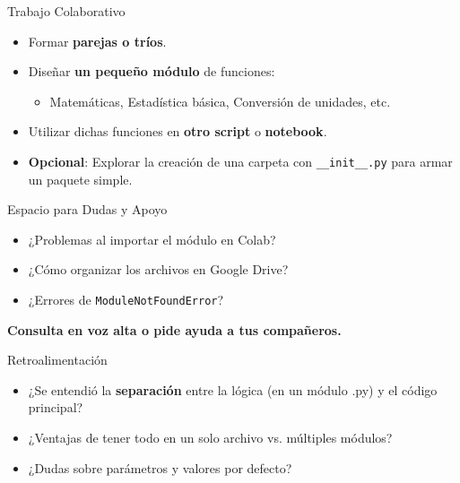 \documentclass[10pt]{beamer}
\begin{document}
\begin{frame}{Trabajo Colaborativo}
  \begin{itemize}
    \item Formar \textbf{parejas o tríos}.
    \item Diseñar \textbf{un pequeño módulo} de funciones:
      \begin{itemize}
        \item Matemáticas, Estadística básica, Conversión de unidades, etc.
      \end{itemize}
    \item Utilizar dichas funciones en \textbf{otro script} o \textbf{notebook}.
    \item \textbf{Opcional}: Explorar la creación de una carpeta con \texttt{\_\_init\_\_.py} para armar un paquete simple.
  \end{itemize}
\end{frame}

\begin{frame}{Espacio para Dudas y Apoyo}
  \begin{itemize}
    \item ¿Problemas al importar el módulo en Colab?
    \item ¿Cómo organizar los archivos en Google Drive?
    \item ¿Errores de \texttt{ModuleNotFoundError}?
  \end{itemize}
  \vspace{0.2cm}
  \textbf{Consulta en voz alta o pide ayuda a tus compañeros.}
\end{frame}

\begin{frame}{Retroalimentación}
  \begin{itemize}
    \item ¿Se entendió la \textbf{separación} entre la lógica (en un módulo .py) y el código principal?
    \item ¿Ventajas de tener todo en un solo archivo vs. múltiples módulos?
    \item ¿Dudas sobre parámetros y valores por defecto?
  \end{itemize}
\end{frame}
\end{document}
